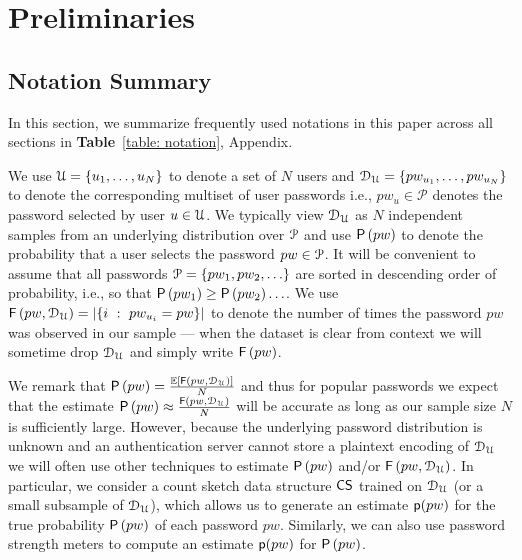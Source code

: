 



\vspace*{-\baselineskip}
\section{Preliminaries} \label{section:Prelinmaries}
\vspace*{-\baselineskip}
\subsection{{Notation Summary}}
\vspace*{-\baselineskip}
In this section, we summarize frequently used notations in this paper across all sections in \textbf{Table}~\ref{table: notation}, Appendix.  %


We use $\mathcal{U} = \{u_1,\ldots,u_N\}$ to denote a set of $N$ users and $\mathcal{D}_{{\mathcal{U}}} = \{pw_{u_1},\ldots,pw_{u_N}\}$ to denote the corresponding multiset of user passwords {  i.e.,  $pw_u \in \mathcal{P}$ denotes the password selected by user $u \in \mathcal{U}$}. We typically view $\mathcal{D}_{{\mathcal{U}}}$ as $N$ independent samples from an underlying distribution over $\mathcal{P}$ and use $\mathsf{P}\left(pw\right)$ to denote the probability that a user selects the password $pw \in \mathcal{P}$. It will be convenient to assume that all passwords $ \mathcal{P} = \{pw_1,pw_2,\ldots \}$ are sorted in descending order of probability, i.e., so that $\mathsf{P}\left(pw_1\right) \geq \mathsf{P}\left(pw_2\right) \ldots $. {We use} $\mathsf{F}\left(pw, \mathcal{D}_{{\mathcal{U}}} \right)= \left| \left\{ i ~:~pw_{u_i} = pw \right\} \right|$ to denote the number of times the password $pw$ was observed in our sample {--- when the dataset is clear from context we will sometime drop $\mathcal{D}_{{\mathcal{U}}}$  and simply write $\mathsf{F}\left(pw\right)$.} 

We remark that $\mathsf{P}\left(pw\right) = \frac{\mathbb{E}\left[ \mathsf{F}\left(pw,  \mathcal{D}_{{\mathcal{U}}}\right)\right]}{N}$ and thus for popular passwords we expect that the estimate $\mathsf{P}\left(pw\right) \approx  \frac{\mathsf{F}\left(pw, \mathcal{D}_{{\mathcal{U}}}\right)}{N}$ will be accurate {as long as our sample size $N$ is sufficiently large}. However, because the underlying password distribution is unknown and an authentication server cannot store a plaintext encoding of $\mathcal{D}_{{\mathcal{U}}}$ we will often use other techniques to estimate  $\mathsf{P}\left(pw\right)$ and/or $\mathsf{F}\left(pw, \mathcal{D}_{{\mathcal{U}}}\right)$. In particular, we consider a count sketch data structure $\mathsf{CS}$ trained on $\mathcal{D}_{{\mathcal{U}}}$ (or a small subsample of $\mathcal{D}_{{\mathcal{U}}}$), which allows us to generate an estimate $\textsf{p}(pw)$ for the {true probability $\mathsf{P}\left(pw\right)$} of each password {$pw$}. Similarly, we can also use password strength meters to compute {an estimate} $\textsf{p}(pw)$ {for} $\mathsf{P}\left(pw\right)$.




